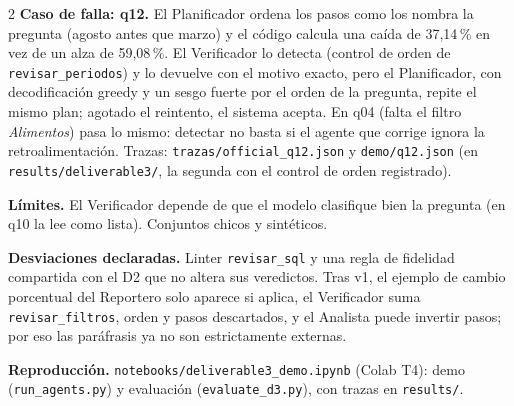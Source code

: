 \documentclass[10pt]{article}
\newcommand{\head}[1]{\textbf{\color{ucblue}#1}\hspace{0.4em}}
\begin{document}
\begin{multicols}{2}
\head{Caso de falla: q12.} El Planificador ordena los pasos como los nombra la pregunta (agosto
antes que marzo) y el código calcula una caída de 37,14\,\% en vez de un alza de 59,08\,\%. El
Verificador lo detecta (control de orden de \texttt{revisar\_periodos}) y lo devuelve con el motivo exacto, pero el Planificador, con decodificación
greedy y un sesgo fuerte por el orden de la pregunta, repite el mismo plan; agotado el reintento, el
sistema acepta. En q04 (falta el filtro \textit{Alimentos}) pasa lo mismo: detectar no basta si el
agente que corrige ignora la retroalimentación. Trazas: \texttt{trazas/official\_q12.json} y
\texttt{demo/q12.json} (en \texttt{results/deliverable3/}, la segunda con el control de orden registrado).

\head{Límites.} El Verificador depende de que el modelo clasifique bien la pregunta (en q10 la
lee como lista). Conjuntos chicos y sintéticos.

\head{Desviaciones declaradas.} Linter \texttt{revisar\_sql} y una regla de fidelidad compartida con
el D2 que no altera sus veredictos. Tras v1, el ejemplo de cambio porcentual del Reportero solo
aparece si aplica, el Verificador suma \texttt{revisar\_filtros}, orden y pasos descartados, y el
Analista puede invertir pasos; por eso las paráfrasis ya no son estrictamente externas.

\head{Reproducción.} \texttt{notebooks/deliverable3\_demo.ipynb} (Colab T4): demo
(\texttt{run\_agents.py}) y evaluación (\texttt{evaluate\_d3.py}), con trazas en \texttt{results/}.
\end{multicols}

\vspace{-6pt}
\begin{center}
\footnotesize

\end{center}
\end{document}
